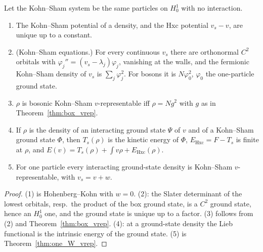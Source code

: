 \begin{theorem}
  \label{thm:line_ks}
  \leanok
  Let the Kohn--Sham system be the same particles on $H^1_0$ with no interaction.
  \begin{enumerate}
    \item The Kohn--Sham potential of a density, and the Hxc potential $v_s-v$, are unique up to a constant.
    \item (Kohn--Sham equations.) For every continuous $v_s$ there are orthonormal $C^2$ orbitals with
      $\varphi_j''=(v_s-\lambda_j)\varphi_j$, vanishing at the walls, and the fermionic Kohn--Sham density of $v_s$ is
      $\sum_j\varphi_j^2$. For bosons it is $N\varphi_0^2$, $\varphi_0$ the one-particle ground state.
    \item $\rho$ is bosonic Kohn--Sham $v$-representable iff $\rho=Ng^2$ with $g$ as in Theorem~\ref{thm:box_vrep}.
    \item If $\rho$ is the density of an interacting ground state $\Psi$ of $v$ and of a Kohn--Sham ground state $\Phi$,
      then $T_s(\rho)$ is the kinetic energy of $\Phi$, $E_{\mathrm{Hxc}}=F-T_s$ is finite at $\rho$, and
      $E(v)=T_s(\rho)+\int v\rho+E_{\mathrm{Hxc}}(\rho)$.
    \item For one particle every interacting ground-state density is Kohn--Sham $v$-representable, with $v_s=v+w$.
  \end{enumerate}
\end{theorem}
\begin{proof}
  \leanok
  (1) is Hohenberg--Kohn with $w=0$. (2): the Slater determinant of the lowest orbitals, resp.\ the product of the box
  ground state, is a $C^2$ ground state, hence an $H^1_0$ one, and the ground state is unique up to a factor. (3)
  follows from (2) and Theorem~\ref{thm:box_vrep}. (4): at a ground-state density the Lieb functional is the
  intrinsic energy of the ground state. (5) is Theorem~\ref{thm:one_W_vrep}.
\end{proof}

